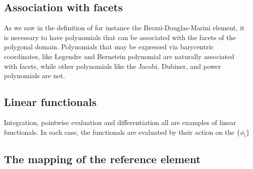 \subsection{Association with facets}
As we saw in the definition of for instance the  Brezzi-Douglas-Marini element,  
it is necessary to have polynomials that can be associated with the facets of the polygonal 
domain. Polynomials that may be expressed via barycentric coordinates, like Legendre and 
Bernstein polynomial are naturally associated with facets, while other polynomials like
the Jacobi, Dubiner, and power polynomials are not.         

\subsection{Linear functionals}
Integration, pointwise evaluation and differentiation all are examples
of linear functionals.  In each case, the functionals are evaluated by
their action on the \( \{ \phi_i \} \)

\subsection{The mapping of the reference element}

